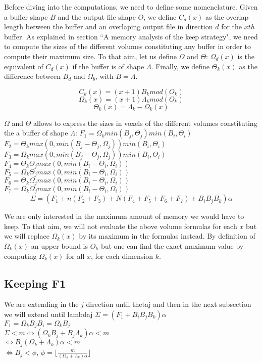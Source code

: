 \documentclass[conference]{IEEEtran}
\begin{document}
Before diving into the computations, we need to define some nomenclature.
Given a buffer shape $B$ and the output file shape $O$, we define $C_d(x)$ as
the overlap length between the buffer and an overlaping output file in direction
$d$ for the $x{th}$ buffer. As explained in section
``A memory analysis of the keep strategy", we need to compute the sizes of
the different volumes constituting any buffer in order to compute their
maximum size. To that aim, let us define $\Omega$ and $\Theta$: $\Omega_d(x)$
is the equivalent of $C_d(x)$ if the buffer is of shape $\Lambda$. Finally, we
define $\Theta_k(x)$ as the difference between $B_d$ and $\Omega_b$, with
$B=\Lambda$.

$$C_k(x) = (x+1)B_k mod(O_k)$$
$$\Omega_k(x) = (x+1)\Lambda_k mod(O_k)$$
$$\Theta_k(x) = \Lambda_k - \Omega_k(x)$$

$\Omega$ and $\Theta$ allows to express the sizes in voxels of the different
volumes constituting the a buffer of shape $\Lambda$:
$F_1 = \Omega_k min(B_j, \Theta_j) min(B_i, \Theta_i)$ \\
$F_2 = \Theta_k max(0, min(B_j - \Theta_j, \Omega_j)) min(B_i, \Theta_i)$ \\
$F_3 = \Omega_k max(0, min(B_j - \Theta_j, \Omega_j)) min(B_i, \Theta_i)$ \\
$F_4 = \Theta_k \Theta_j max(0, min(B_i-\Theta_i, \Omega_i))$ \\
$F_5 = \Omega_k \Theta_j max(0, min(B_i-\Theta_i, \Omega_i))$ \\
$F_6 = \Theta_k \Omega_j max(0, min(B_i-\Theta_i, \Omega_i))$ \\
$F_7 = \Omega_k \Omega_j max(0, min(B_i-\Theta_i, \Omega_i))$ \\

$$\Sigma = (F_1 + n(F_2 + F_3) + N(F_4 + F_5 + F_6 + F_7) + B_iB_jB_k)\alpha$$

We are only interested in the maximum amount of memory we would have to keep.
To that aim, we will not evaluate the above volume formulas for each $x$ but we
will replace $\Omega_k(x)$ by its maximum in the formulas instead. By definition
of $\Omega_k(x)$ an upper bound is $O_k$ but one can find the exact maximum
value by computing $\Omega_k(x)$ for all $x$, for each dimension $k$.

\subsection{Keeping F1}
We are extending in the $j$ direction until thetaj and then in the next subsection we will extend until lambdaj
\noindent $\Sigma = (F_1 + B_iB_jB_k)\alpha$ \\
$F_1 = \Omega_k B_j B_i = \Omega_k B_j$ \\
$\Sigma < m \Leftrightarrow (\Omega_k B_j + B_j \Lambda_k)\alpha < m$ \\
$\Leftrightarrow B_j (\Omega_k + \Lambda_k) \alpha < m $ \\
$\Leftrightarrow B_j < \phi$, $\phi = \lfloor \frac{m}{(\Omega_k + \Lambda_k)\alpha} \rfloor$
\end{document}
